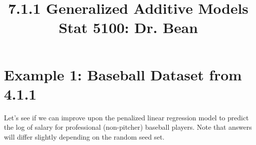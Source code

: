 \documentclass{article}\usepackage[]{graphicx}\usepackage[]{color}
\begin{document}
\title{%
  7.1.1 Generalized Additive Models \\
  \smallskip
  \large Stat 5100: Dr. Bean
}
\date{}

\maketitle

\section*{Example 1: Baseball Dataset from 4.1.1}

Let's see if we can improve upon the penalized linear regression model to predict the log of salary for professional (non-pitcher) baseball players. Note that answers will differ slightly depending on the random seed set.
\end{document}
